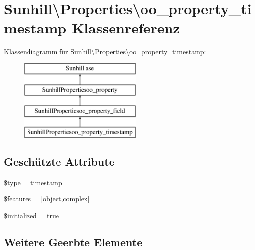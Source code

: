 \hypertarget{classSunhill_1_1Properties_1_1oo__property__timestamp}{}\section{Sunhill\textbackslash{}Properties\textbackslash{}oo\+\_\+property\+\_\+timestamp Klassenreferenz}
\label{classSunhill_1_1Properties_1_1oo__property__timestamp}
Klassendiagramm für Sunhill\textbackslash{}Properties\textbackslash{}oo\+\_\+property\+\_\+timestamp\+:\begin{figure}[H]
\begin{center}
\leavevmode
\includegraphics[height=4.000000cm]{d9/def/classSunhill_1_1Properties_1_1oo__property__timestamp}
\end{center}
\end{figure}
\subsection*{Geschützte Attribute}
\begin{DoxyCompactItemize}
\item 
\hyperlink{classSunhill_1_1Properties_1_1oo__property__timestamp_aa998025384958de7c1e64e66b8264ef7}{\$type} = \textquotesingle{}timestamp\textquotesingle{}
\item 
\hyperlink{classSunhill_1_1Properties_1_1oo__property__timestamp_a18594e6dfc5494c2ffd1c1c9fe18d7d5}{\$features} = \mbox{[}\textquotesingle{}object\textquotesingle{},\textquotesingle{}complex\textquotesingle{}\mbox{]}
\item 
\hyperlink{classSunhill_1_1Properties_1_1oo__property__timestamp_a0d0962b11149632ae7a254e92d5715ad}{\$initialized} = true
\end{DoxyCompactItemize}
\subsection*{Weitere Geerbte Elemente}


